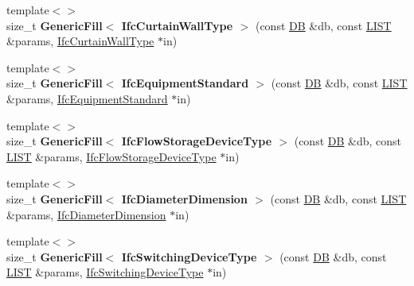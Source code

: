 \begin{DoxyCompactItemize}
\item 
\hypertarget{namespace_assimp_1_1_s_t_e_p_a5dceebe43f6da386cab53e39638ca0ba}{{\footnotesize template$<$$>$ }\\size\+\_\+t {\bfseries Generic\+Fill$<$ Ifc\+Curtain\+Wall\+Type $>$} (const \hyperlink{class_assimp_1_1_s_t_e_p_1_1_d_b}{D\+B} \&db, const \hyperlink{class_assimp_1_1_s_t_e_p_1_1_e_x_p_r_e_s_s_1_1_l_i_s_t}{L\+I\+S\+T} \&params, \hyperlink{struct_assimp_1_1_i_f_c_1_1_ifc_curtain_wall_type}{Ifc\+Curtain\+Wall\+Type} $\ast$in)}\label{namespace_assimp_1_1_s_t_e_p_a5dceebe43f6da386cab53e39638ca0ba}

\item 
\hypertarget{namespace_assimp_1_1_s_t_e_p_a904c727ea281c9df863cc62414453773}{{\footnotesize template$<$$>$ }\\size\+\_\+t {\bfseries Generic\+Fill$<$ Ifc\+Equipment\+Standard $>$} (const \hyperlink{class_assimp_1_1_s_t_e_p_1_1_d_b}{D\+B} \&db, const \hyperlink{class_assimp_1_1_s_t_e_p_1_1_e_x_p_r_e_s_s_1_1_l_i_s_t}{L\+I\+S\+T} \&params, \hyperlink{struct_assimp_1_1_i_f_c_1_1_ifc_equipment_standard}{Ifc\+Equipment\+Standard} $\ast$in)}\label{namespace_assimp_1_1_s_t_e_p_a904c727ea281c9df863cc62414453773}

\item 
\hypertarget{namespace_assimp_1_1_s_t_e_p_a0d4df143897c8c9ab631e9f40bfab524}{{\footnotesize template$<$$>$ }\\size\+\_\+t {\bfseries Generic\+Fill$<$ Ifc\+Flow\+Storage\+Device\+Type $>$} (const \hyperlink{class_assimp_1_1_s_t_e_p_1_1_d_b}{D\+B} \&db, const \hyperlink{class_assimp_1_1_s_t_e_p_1_1_e_x_p_r_e_s_s_1_1_l_i_s_t}{L\+I\+S\+T} \&params, \hyperlink{struct_assimp_1_1_i_f_c_1_1_ifc_flow_storage_device_type}{Ifc\+Flow\+Storage\+Device\+Type} $\ast$in)}\label{namespace_assimp_1_1_s_t_e_p_a0d4df143897c8c9ab631e9f40bfab524}

\item 
\hypertarget{namespace_assimp_1_1_s_t_e_p_ac88da4d29deebe2d66fe212c7ae10243}{{\footnotesize template$<$$>$ }\\size\+\_\+t {\bfseries Generic\+Fill$<$ Ifc\+Diameter\+Dimension $>$} (const \hyperlink{class_assimp_1_1_s_t_e_p_1_1_d_b}{D\+B} \&db, const \hyperlink{class_assimp_1_1_s_t_e_p_1_1_e_x_p_r_e_s_s_1_1_l_i_s_t}{L\+I\+S\+T} \&params, \hyperlink{struct_assimp_1_1_i_f_c_1_1_ifc_diameter_dimension}{Ifc\+Diameter\+Dimension} $\ast$in)}\label{namespace_assimp_1_1_s_t_e_p_ac88da4d29deebe2d66fe212c7ae10243}

\item 
\hypertarget{namespace_assimp_1_1_s_t_e_p_a99edb66c09667e6cb1addaf986aa2f2b}{{\footnotesize template$<$$>$ }\\size\+\_\+t {\bfseries Generic\+Fill$<$ Ifc\+Switching\+Device\+Type $>$} (const \hyperlink{class_assimp_1_1_s_t_e_p_1_1_d_b}{D\+B} \&db, const \hyperlink{class_assimp_1_1_s_t_e_p_1_1_e_x_p_r_e_s_s_1_1_l_i_s_t}{L\+I\+S\+T} \&params, \hyperlink{struct_assimp_1_1_i_f_c_1_1_ifc_switching_device_type}{Ifc\+Switching\+Device\+Type} $\ast$in)}\label{namespace_assimp_1_1_s_t_e_p_a99edb66c09667e6cb1addaf986aa2f2b}


\end{DoxyCompactItemize}
